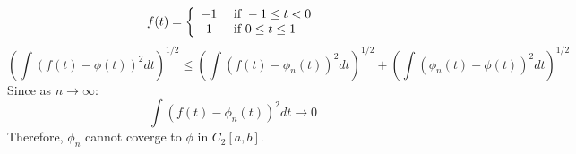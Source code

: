 \documentclass[5pt,letterpaper,reqno]{amsart}
\begin{document}
\begin{enumerate}[1.]
\begin{flushleft}
    $$f ( t ) = \left\{ \begin{array} { c l } { - 1 } & { \text { if } - 1 \leq t < 0 } \\ { 1 } & { \text { if } 0 \leq t \leq 1 } \end{array} \right.$$
    $$\left( \int ( f ( t ) - \phi ( t ) ) ^ { 2 } d t \right) ^ { 1 / 2 } \leq \left( \int \left( f ( t ) - \phi _ { n } ( t ) \right) ^ { 2 } d t \right) ^ { 1 / 2 } + \left( \int \left( \phi _ { n } ( t ) - \phi ( t ) \right) ^ { 2 } d t \right) ^ { 1 / 2 }$$
    Since as $n \rightarrow \infty$:
    $$\int \left( f ( t ) - \phi _ { n } ( t ) \right) ^ { 2 } d t \rightarrow 0$$
    Therefore, $\phi_n$ cannot coverge to $\phi$ in $C_2[a,b]$. 
\end{flushleft}
\end{enumerate}
\end{document}
